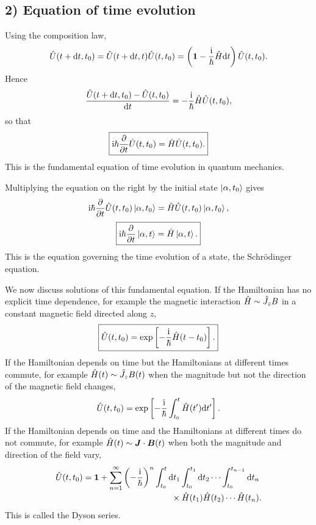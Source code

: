 \subsection*{2) Equation of time evolution}
Using the composition law,
\begin{equation}
\hat{U}(t+\mathrm{d} t,t_0)=\hat{U}(t+\mathrm{d} t,t)\hat{U}(t,t_0)
=\left(\mathbf1-\frac{\mathrm{i}}{\hbar}\hat{H}\mathrm{d} t\right)\hat{U}(t,t_0).
\end{equation}
Hence
\begin{equation}
\frac{\hat{U}(t+\mathrm{d} t,t_0)-\hat{U}(t,t_0)}{\mathrm{d} t}
=-\frac{\mathrm{i}}{\hbar}\hat{H}\hat{U}(t,t_0),
\end{equation}
so that
\begin{equation}
\boxed{\mathrm{i}\hbar\frac{\partial}{\partial t}\hat{U}(t,t_0)
=\hat{H}\hat{U}(t,t_0).}
\end{equation}
This is the fundamental equation of time evolution in quantum mechanics.

Multiplying the equation on the right by the initial state $\left|\alpha,t_0\right\rangle$ gives
\begin{equation}
\mathrm{i}\hbar\frac{\partial}{\partial t}\hat{U}(t,t_0)\left|\alpha,t_0\right\rangle
=\hat{H}\hat{U}(t,t_0)\left|\alpha,t_0\right\rangle,
\end{equation}
\begin{equation}
\boxed{\mathrm{i}\hbar\frac{\partial}{\partial t}\left|\alpha,t\right\rangle=\hat{H}\left|\alpha,t\right\rangle.}
\end{equation}
This is the equation governing the time evolution of a state, the Schr\"odinger equation.

We now discuss solutions of this fundamental equation. If the Hamiltonian has no explicit time dependence, for example the magnetic interaction $\hat{H}\sim\hat{J}_z B$ in a constant magnetic field directed along $z$,
\begin{equation}
\boxed{\hat{U}(t,t_0)=\exp\left[-\frac{\mathrm{i}}{\hbar}\hat{H}(t-t_0)\right].}
\end{equation}
If the Hamiltonian depends on time but the Hamiltonians at different times commute, for example $\hat{H}(t)\sim\hat{J}_z B(t)$ when the magnitude but not the direction of the magnetic field changes,
\begin{equation}
\hat{U}(t,t_0)=\exp\left[-\frac{\mathrm{i}}{\hbar}\int_{t_0}^t\hat{H}(t')\mathrm{d} t'\right].
\end{equation}
If the Hamiltonian depends on time and the Hamiltonians at different times do not commute, for example $\hat{H}(t)\sim\bm{J}\cdot\bm{B}(t)$ when both the magnitude and direction of the field vary,
\begin{equation}
\begin{split}
\hat{U}(t,t_0)=\mathbf1+\sum_{n=1}^{\infty}\left(-\frac{\mathrm{i}}{\hbar}\right)^n
&\int_{t_0}^{t}\mathrm{d} t_1\int_{t_0}^{t_1}\mathrm{d} t_2\cdots
\int_{t_0}^{t_{n-1}}\mathrm{d} t_n\\[-2pt]
&\qquad\times \hat{H}(t_1)\hat{H}(t_2)\cdots\hat{H}(t_n).
\end{split}
\end{equation}
This is called the Dyson series.

